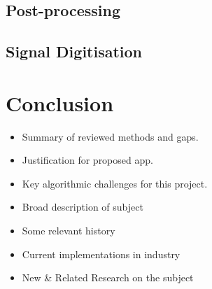 
\subsection{Post-processing}

\subsection{Signal Digitisation}


\section{Conclusion}

\begin{itemize}
    \item Summary of reviewed methods and gaps.
    \item Justification for proposed app.
    \item Key algorithmic challenges for this project.
\end{itemize}

\begin{itemize}
	\item{Broad description of subject}
	\item{Some relevant history}
	\item{Current implementations in industry}
	\item{New \& Related Research on the subject}
\end{itemize}